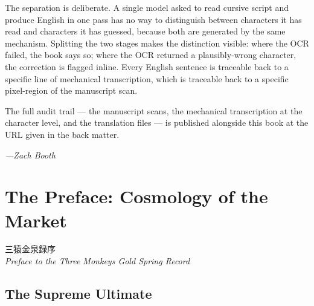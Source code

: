 \documentclass[10pt, openany]{book}
\newcommand{\jp}[1]{{\japanesefont #1}}
\begin{document}
The separation is deliberate. A single model asked to read cursive
script and produce English in one pass has no way to distinguish
between characters it has read and characters it has guessed,
because both are generated by the same mechanism. Splitting the
two stages makes the distinction visible: where the OCR failed,
the book says so; where the OCR returned a plausibly-wrong
character, the correction is flagged inline. Every English
sentence is traceable back to a specific line of mechanical
transcription, which is traceable back to a specific pixel-region
of the manuscript scan.

The full audit trail --- the manuscript scans, the mechanical
transcription at the character level, and the translation files
--- is published alongside this book at the URL given in the back
matter.

\vspace{1em}
\begin{flushright}
\textit{---Zach Booth}
\end{flushright}



\chapter{The Preface: Cosmology of the Market}

\begin{center}
\jp{三猿金泉録序}\\[0.3em]
\textit{Preface to the Three Monkeys Gold Spring Record}
\end{center}

\vspace{1em}

\section{The Supreme Ultimate}
\end{document}
